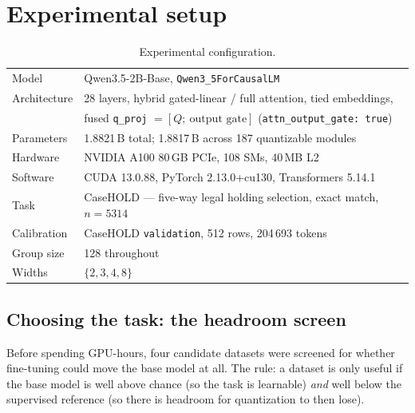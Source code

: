 \documentclass[11pt]{article}
\newcommand{\code}[1]{\texttt{#1}}
\begin{document}
\newpage
\section{Experimental setup}

\begin{table}[H]
\centering\small
\caption{Experimental configuration.}
\begin{tabular}{ll}
\toprule
Model & Qwen3.5-2B-Base, \code{Qwen3\_5ForCausalLM} \\
\rowcolor{rowtint}
Architecture & 28 layers, hybrid gated-linear / full attention, tied embeddings, \\
\rowcolor{rowtint}
 & fused \code{q\_proj} $=[Q;\ \text{output gate}]$ (\code{attn\_output\_gate: true}) \\
Parameters & 1.8821\,B total; 1.8817\,B across 187 quantizable modules \\
\rowcolor{rowtint}
Hardware & NVIDIA A100 80\,GB PCIe, 108 SMs, 40\,MB L2 \\
Software & CUDA 13.0.88, PyTorch 2.13.0+cu130, Transformers 5.14.1 \\
\rowcolor{rowtint}
Task & CaseHOLD --- five-way legal holding selection, exact match, $n = 5314$ \\
Calibration & CaseHOLD \code{validation}, 512 rows, 204\,693 tokens \\
\rowcolor{rowtint}
Group size & 128 throughout \\
Widths & $\{2, 3, 4, 8\}$ \\
\bottomrule
\end{tabular}
\end{table}

\subsection{Choosing the task: the headroom screen}

Before spending GPU-hours, four candidate datasets were screened for whether fine-tuning could
move the base model at all. The rule: a dataset is only useful if the base model is well above
chance (so the task is learnable) \emph{and} well below the supervised reference (so there is
headroom for quantization to then lose).
\end{document}
